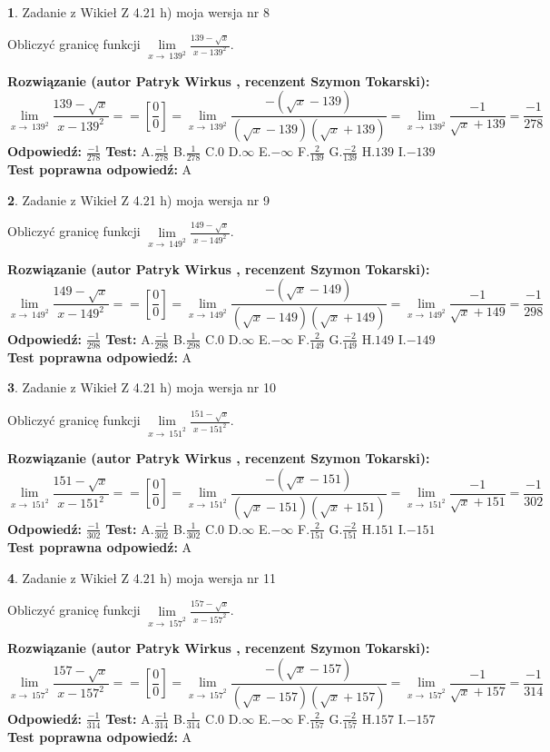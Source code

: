 \documentclass[12pt, a4paper]{article}
\theoremstyle{definition} %
\newtheorem{zad}{}
\newcommand{\zadStart}[1]{\begin{zad}#1\newline}
\newcommand{\zadStop}{\end{zad}}
\newcommand{\rozwStart}[2]{\noindent \textbf{Rozwiązanie (autor #1 , recenzent #2): }\newline}
\newcommand{\rozwStop}{\newline}
\newcommand{\odpStart}{\noindent \textbf{Odpowiedź:}\newline}
\newcommand{\odpStop}{\newline}
\newcommand{\testStart}{\noindent \textbf{Test:}\newline}
\newcommand{\testStop}{\newline}
\newcommand{\kluczStart}{\noindent \textbf{Test poprawna odpowiedź:}\newline}
\newcommand{\kluczStop}{\newline}
\begin{document}
\zadStart{Zadanie z Wikieł Z 4.21 h) moja wersja nr 8}

Obliczyć granicę funkcji $\lim\limits_{x\to\ 139^{2}}\frac{139-\sqrt{x}}{x-139^{2}}$.
\zadStop
\rozwStart{Patryk Wirkus}{Szymon Tokarski}
$$\lim\limits_{x\to\ 139^{2}}\frac{139-\sqrt{x}}{x-139^{2}} = = [\frac{0}{0}] = \lim\limits_{x\to\ 139^{2}}\frac{-(\sqrt{x}-139)}{(\sqrt{x}-139)(\sqrt{x}+139)} = \lim\limits_{x\to\ 139^{2}}\frac{-1}{\sqrt{x}+139} = \frac{-1}{278}$$
\rozwStop
\odpStart
$\frac{-1}{278}$
\odpStop
\testStart
A.$\frac{-1}{278}$ B.$\frac{1}{278}$ C.$0$ D.$\infty$ E.$-\infty$
F.$\frac{2}{139}$ G.$\frac{-2}{139}$
H.$139$
I.$-139$
\testStop
\kluczStart
A
\kluczStop



\zadStart{Zadanie z Wikieł Z 4.21 h) moja wersja nr 9}

Obliczyć granicę funkcji $\lim\limits_{x\to\ 149^{2}}\frac{149-\sqrt{x}}{x-149^{2}}$.
\zadStop
\rozwStart{Patryk Wirkus}{Szymon Tokarski}
$$\lim\limits_{x\to\ 149^{2}}\frac{149-\sqrt{x}}{x-149^{2}} = = [\frac{0}{0}] = \lim\limits_{x\to\ 149^{2}}\frac{-(\sqrt{x}-149)}{(\sqrt{x}-149)(\sqrt{x}+149)} = \lim\limits_{x\to\ 149^{2}}\frac{-1}{\sqrt{x}+149} = \frac{-1}{298}$$
\rozwStop
\odpStart
$\frac{-1}{298}$
\odpStop
\testStart
A.$\frac{-1}{298}$ B.$\frac{1}{298}$ C.$0$ D.$\infty$ E.$-\infty$
F.$\frac{2}{149}$ G.$\frac{-2}{149}$
H.$149$
I.$-149$
\testStop
\kluczStart
A
\kluczStop



\zadStart{Zadanie z Wikieł Z 4.21 h) moja wersja nr 10}

Obliczyć granicę funkcji $\lim\limits_{x\to\ 151^{2}}\frac{151-\sqrt{x}}{x-151^{2}}$.
\zadStop
\rozwStart{Patryk Wirkus}{Szymon Tokarski}
$$\lim\limits_{x\to\ 151^{2}}\frac{151-\sqrt{x}}{x-151^{2}} = = [\frac{0}{0}] = \lim\limits_{x\to\ 151^{2}}\frac{-(\sqrt{x}-151)}{(\sqrt{x}-151)(\sqrt{x}+151)} = \lim\limits_{x\to\ 151^{2}}\frac{-1}{\sqrt{x}+151} = \frac{-1}{302}$$
\rozwStop
\odpStart
$\frac{-1}{302}$
\odpStop
\testStart
A.$\frac{-1}{302}$ B.$\frac{1}{302}$ C.$0$ D.$\infty$ E.$-\infty$
F.$\frac{2}{151}$ G.$\frac{-2}{151}$
H.$151$
I.$-151$
\testStop
\kluczStart
A
\kluczStop



\zadStart{Zadanie z Wikieł Z 4.21 h) moja wersja nr 11}

Obliczyć granicę funkcji $\lim\limits_{x\to\ 157^{2}}\frac{157-\sqrt{x}}{x-157^{2}}$.
\zadStop
\rozwStart{Patryk Wirkus}{Szymon Tokarski}
$$\lim\limits_{x\to\ 157^{2}}\frac{157-\sqrt{x}}{x-157^{2}} = = [\frac{0}{0}] = \lim\limits_{x\to\ 157^{2}}\frac{-(\sqrt{x}-157)}{(\sqrt{x}-157)(\sqrt{x}+157)} = \lim\limits_{x\to\ 157^{2}}\frac{-1}{\sqrt{x}+157} = \frac{-1}{314}$$
\rozwStop
\odpStart
$\frac{-1}{314}$
\odpStop
\testStart
A.$\frac{-1}{314}$ B.$\frac{1}{314}$ C.$0$ D.$\infty$ E.$-\infty$
F.$\frac{2}{157}$ G.$\frac{-2}{157}$
H.$157$
I.$-157$
\testStop
\kluczStart
A
\kluczStop
\end{document}
